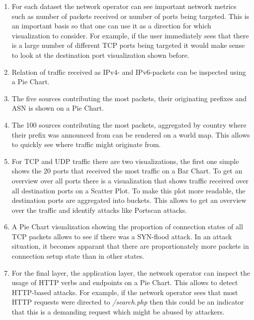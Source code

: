  \begin{enumerate}
     \item For each dataset the network operator can see important network metrics such as number of packets received or number of ports being targeted. This is an important basis so that one can use it as a direction for which visualization to consider. For example, if the user immediately sees that there is a large number of different TCP ports being targeted it would make sense to look at the destination port visualization shown before.
     \item Relation of traffic received as IPv4- and IPv6-packets can be inspected using a Pie Chart.
     \item The five sources contributing the most packets, their originating prefixes and ASN is shown on a Pie Chart.
     \item The 100 sources contributing the most packets, aggregated by country where their prefix was announced from can be rendered on a world map. This allows to quickly see where traffic might originate from.
     \item For TCP and UDP traffic there are two visualizations, the first one simple shows the 20 ports that received the most traffic on a Bar Chart. To get an overview over all ports there is a visualization that shows traffic received over all destination ports on a Scatter Plot. To make this plot more readable, the destination ports are aggregated into buckets. This allows to get an overview over the traffic and identify attacks like Portscan attacks.
     \item A Pie Chart visualization showing the proportion of connection states of all TCP packets allows to see if there was a SYN-flood attack. In an attack situation, it becomes apparant that there are proportionately more packets in connection setup state than in other states.
     \item For the final layer, the application layer, the network operator can inspect the usage of HTTP verbs and endpoints on a Pie Chart. This allows to detect HTTP-based attacks. For example, if the network operator sees that most HTTP requests were directed to \textit{/search.php} then this could be an indicator that this is a demanding request which might be abused by attackers.
 \end{enumerate}{}




